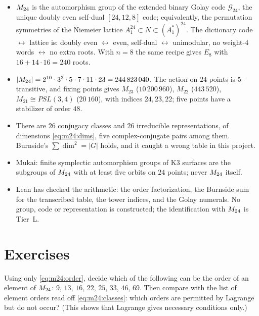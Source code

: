 \begin{summarybox}
\begin{itemize}[leftmargin=*,itemsep=2pt]
\item $M_{24}$ is the automorphism group of the extended binary Golay code $\mathcal G_{24}$,
 the unique doubly even self-dual $[24,12,8]$ code; equivalently, the permutation
 symmetries of the Niemeier lattice $A_1^{24}\subset N\subset(A_1^*)^{24}$. The dictionary
 code $\leftrightarrow$ lattice is: doubly even $\leftrightarrow$ even, self-dual
 $\leftrightarrow$ unimodular, no weight-$4$ words $\leftrightarrow$ no extra roots. With
 $n=8$ the same recipe gives $E_8$ with $16+14\cdot16=240$ roots.
\item $|M_{24}|=2^{10}\cdot3^3\cdot5\cdot7\cdot11\cdot23=244\,823\,040$. The action on $24$
 points is $5$-transitive, and fixing points gives $M_{23}$ ($10\,200\,960$), $M_{22}$
 ($443\,520$), $M_{21}\cong PSL(3,4)$ ($20\,160$), with indices $24,23,22$; five points have
 a stabilizer of order $48$.
\item There are $26$ conjugacy classes and $26$ irreducible representations, of dimensions
 \eqref{eq:m24:dims}, five complex-conjugate pairs among them. Burnside's
 $\sum\dim^2=|G|$ holds, and it caught a wrong table in this project.
\item Mukai: finite symplectic automorphism groups of K3 surfaces are the subgroups of
 $M_{24}$ with at least five orbits on $24$ points; never $M_{24}$ itself.
\item Lean has checked the arithmetic: the order factorization, the Burnside sum for the
 transcribed table, the tower indices, and the Golay numerals. No group, code or
 representation is constructed; the identification with $M_{24}$ is Tier~L.
\end{itemize}
\end{summarybox}

\section*{Exercises}

\begin{exercise}\label{ex:m24:lagrange}
Using only \eqref{eq:m24:order}, decide which of the following can be the order of an
element of $M_{24}$: $9$, $13$, $16$, $22$, $25$, $33$, $46$, $69$. Then compare with the list
of element orders read off \eqref{eq:m24:classes}: which orders are permitted by Lagrange
but do not occur? (This shows that Lagrange gives necessary conditions only.)
\end{exercise}

